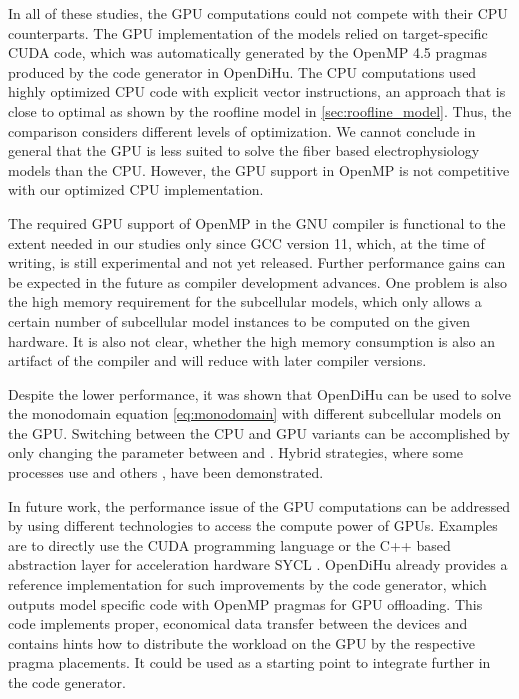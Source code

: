 In all of these studies, the GPU computations could not compete with their CPU counterparts. The GPU implementation of the models relied on target-specific CUDA code, which was automatically generated by the OpenMP 4.5 pragmas produced by the code generator in OpenDiHu. The CPU computations used highly optimized CPU code with explicit vector instructions, an approach that is close to optimal as shown by the roofline model in \cref{sec:roofline_model}. Thus, the comparison considers different levels of optimization. We cannot conclude in general that the GPU is less suited to solve the fiber based electrophysiology models than the CPU. However, the GPU support in OpenMP is not competitive with our optimized CPU implementation.

The required GPU support of OpenMP in the GNU compiler is functional to the extent needed in our studies only since GCC version 11, which, at the time of writing, is still experimental and not yet released. Further performance gains can be expected in the future as compiler development advances. One problem is also the high memory requirement for the subcellular models, which only allows a certain number of subcellular model instances to be computed on the given hardware. It is also not clear, whether the high memory consumption is also an artifact of the compiler and will reduce with later compiler versions.

Despite the lower performance, it was shown that OpenDiHu can be used to solve the monodomain equation \cref{eq:monodomain} with different subcellular models on the GPU. Switching between the CPU and GPU variants can be accomplished by only changing the  parameter between  and . Hybrid strategies, where some processes use  and others , have been demonstrated.

In future work, the performance issue of the GPU computations can be addressed by using different technologies to access the compute power of GPUs.
Examples are to directly use the CUDA programming language or the C++ based abstraction layer for acceleration hardware SYCL \cite{sycl}. OpenDiHu already provides a reference implementation for such improvements by the code generator, which outputs model specific code with OpenMP pragmas for GPU offloading. This code implements proper, economical data transfer between the devices and contains hints how to distribute the workload on the GPU by the respective pragma placements. It could be used as a starting point to integrate further  in the code generator.

